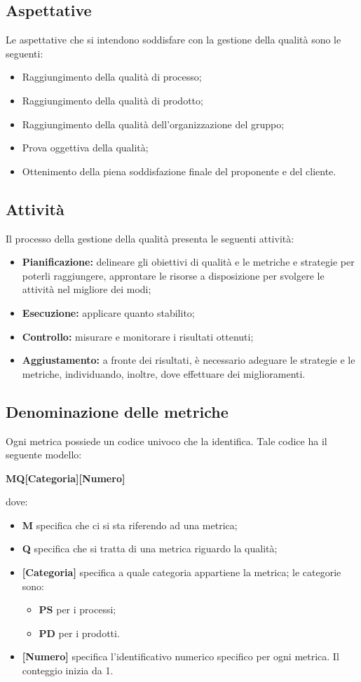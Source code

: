 \subsection{Aspettative} \label{3.3.3}
Le aspettative che si intendono soddisfare con la gestione della qualità sono le seguenti: 
\begin{itemize}
	\item Raggiungimento della qualità di processo;
	\item Raggiungimento della qualità di prodotto;
	\item Raggiungimento della qualità dell’organizzazione del gruppo;
	\item Prova oggettiva della qualità;
	\item Ottenimento della piena soddisfazione finale del proponente e del cliente.
\end{itemize}
\subsection{Attività} \label{3.3.4}
Il processo della gestione della qualità presenta le seguenti attività:
\begin{itemize}
	\item \textbf{Pianificazione:} delineare gli obiettivi di qualità e le metriche e strategie per poterli raggiungere, approntare le risorse a disposizione per svolgere le attività nel migliore dei modi; 
	\item \textbf{Esecuzione:} applicare quanto stabilito;
	\item \textbf{Controllo:} misurare e monitorare i risultati ottenuti;
	\item \textbf{Aggiustamento:} a fronte dei risultati, è necessario adeguare le strategie e le metriche, individuando, inoltre, dove effettuare dei miglioramenti.
\end{itemize}
\subsection{Denominazione delle metriche} \label{3.3.5}
Ogni metrica possiede un codice univoco che la identifica. Tale codice ha il seguente modello: 
\begin{center}
	\textbf {MQ[Categoria][Numero]}
\end{center}
dove: 
\begin{itemize}
	 \item \textbf {M} specifica che ci si sta riferendo ad una metrica;
	 \item \textbf {Q} specifica che si tratta di una metrica riguardo la qualità;
	 \item \textbf {[Categoria]} specifica a quale categoria appartiene la metrica; le categorie sono:
	 \begin{itemize}
		 \item \textbf{PS} per i processi;
		 \item \textbf{PD} per i prodotti.
	 \end{itemize}
	\item \textbf {[Numero]} specifica l’identificativo numerico specifico per ogni metrica. Il conteggio inizia da 1.
\end{itemize}